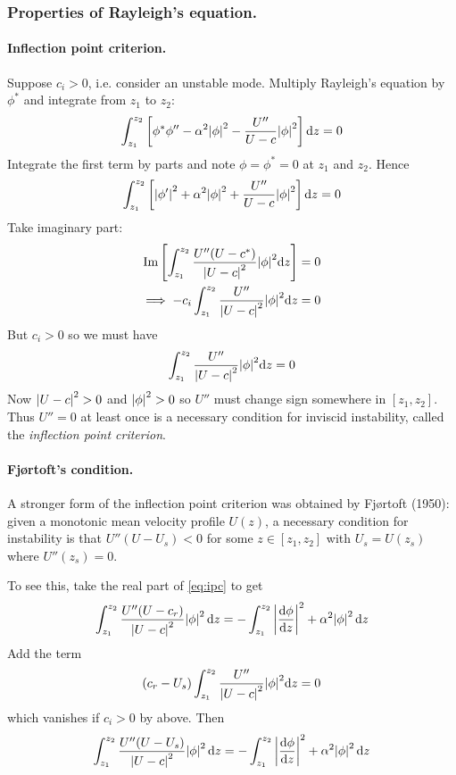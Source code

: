 \documentclass{jknotes}
\begin{document}
\subsubsection{Properties of Rayleigh's equation.}
\paragraph{Inflection point criterion.}
Suppose $c_i > 0$, i.e. consider an unstable mode. Multiply Rayleigh's
equation by $\phi^*$ and integrate from $z_1$ to $z_2$:
\begin{equation}
	\int_{z_1}^{z_2} \left[\phi^* \phi'' - \alpha^2 \abs{\phi}^2 - \frac{U''}{U-c}
	\abs{\phi}^2 \right]\diffd z = 0
\end{equation}
Integrate the first term by parts and note $\phi = \phi^* = 0$ at $z_1$ and
$z_2$. Hence
\begin{equation}
	\int_{z_1}^{z_2} \left[\abs{\phi'}^2  + \alpha^2 \abs{\phi}^2 +
	\frac{U''}{U-c}\abs{\phi}^2 \right] \diffd z =0 \label{eq:ipc}
\end{equation}
Take imaginary part:
\begin{align}
	\Im \left[ \int_{z_1}^{z_2} \frac{U''(U-c^*)}{\abs{U-c}^2} \abs{\phi}^2
	 \diffd z \right]&= 0 \\
\implies
	-c_i\int_{z_1}^{z_2} \frac{U''}{\abs{U-c}^2} \abs{\phi}^2
	\diffd z &= 0
\end{align}
But $c_i > 0$ so we must have
\begin{equation}
\int_{z_1}^{z_2} \frac{U''}{\abs{U-c}^2} \abs{\phi}^2
	\diffd z  = 0
\end{equation}
Now $\abs{U-c}^2 > 0$ and $\abs{\phi}^2 > 0 $ so $U''$ must change sign
somewhere in $\left[z_1,z_2\right]$. Thus $U''=0$ at least once is a necessary
condition for inviscid instability, called the \emph{inflection point
criterion}.

\paragraph{Fj\o rtoft's condition.}
A stronger form of the inflection point criterion was obtained by Fj\o rtoft
(1950): given a monotonic mean velocity profile $U(z)$, a necessary condition
for instability is that $U''(U-U_s) < 0$ for some $z \in \left[ z_1, z_2
\right]$ with $U_s = U(z_s)$ where $U''(z_s) = 0$.

To see this, take the real part of \eqref{eq:ipc} to get
\begin{equation}
	\int_{z_1}^{z_2} \frac{U''(U-c_r)}{\abs{U-c}^2} \abs{\phi}^2 \, \diffd z =
	-\int_{z_1}^{z_2} \abs{\frac{\diffd \phi}{\diffd z}}^2 + \alpha^2
	\abs{\phi}^2 \, \diffd z
\end{equation}
Add the term
\begin{equation}
	(c_r - U_s)\int_{z_1}^{z_2} \frac{U''}{\abs{U-c}^2} \abs{\phi}^2
	\diffd z  = 0
\end{equation}
which vanishes if $c_i > 0$ by above. Then
\begin{equation}
	\int_{z_1}^{z_2} \frac{U''(U-U_s)}{\abs{U-c}^2} \abs{\phi}^2 \, \diffd z =
	-\int_{z_1}^{z_2} \abs{\frac{\diffd \phi}{\diffd z}}^2 + \alpha^2
	\abs{\phi}^2 \, \diffd z
\end{equation}
\end{document}
